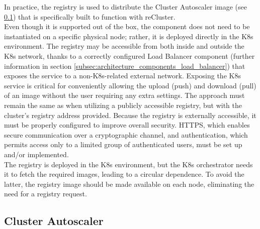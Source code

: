 In practice, the registry is used to distribute the Cluster Autoscaler image (see
\ref{subsec:architecture_components_cluster_autoscaler}) that is specifically
built to function with reCluster. \\ %
Even though it is supported out of the box, the component does not need to be instantiated
on a specific physical node; rather, it is deployed directly in the K8s environment.
The registry may be accessible from both inside and outside the K8s network, thanks
to a correctly configured Load Balancer component (further information in
section \ref{subsec:architecture_components_load_balancer}) that exposes the service
to a non-K8s-related external network. Exposing the K8s service is critical for
conveniently allowing the upload (push) and download (pull) of an image without
the user requiring any extra settings. The approach must remain the same as when
utilizing a publicly accessible registry, but with the cluster's registry
address provided. Because the registry is externally accessible, it must be
properly configured to improve overall security. HTTPS, which enables secure
communication over a cryptographic channel, and authentication, which permits
access only to a limited group of authenticated users, must be set up and/or implemented.
\\ %
The registry is deployed in the K8s environment, but the K8s orchestrator needs
it to fetch the required images, leading to a circular dependence. To avoid the
latter, the registry image should be made available on each node, eliminating
the need for a registry request.

\subsection{Cluster Autoscaler}
\label{subsec:architecture_components_cluster_autoscaler}

